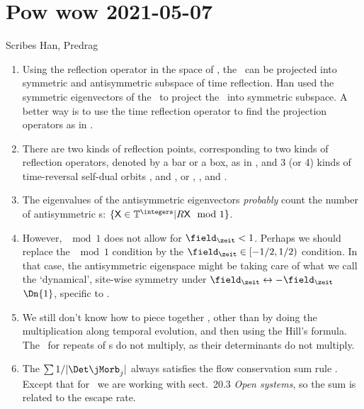 \section{Pow wow 2021-05-07}
\label{sect:pw2021-05-07}

Scribes Han, Predrag
\medskip

\begin{enumerate}
	\item
Using the reflection operator in the space of {\lattstate}, the
\jacobianOrb\ can be projected into symmetric and antisymmetric subspace
of time reflection. Han used the symmetric eigenvectors of the
\jacobianOrb\ to project the \jacobianOrb\ into symmetric subspace. A
better way is to use the time reflection operator to find the projection
operators as in .

	\item
There are two kinds of reflection points, corresponding to two kinds of
reflection operators, denoted by a bar or a box, as in
, and 3 (or 4) kinds of time-reversal self-dual
orbits
,
 and
, or
,
,
and
.

	\item
The eigenvalues of the antisymmetric eigenvectors \emph{probably} count
the number of antisymmetric {\lattstate}s:
$\{\Xx \in \mathbb{T}^\integers | R \Xx \mod 1\}$. %

	\item
However, $\mod 1$ does not allow for $\field_\zeit<1$. Perhaps we should
replace the  $\mod 1$ condition by the $\field_\zeit\in[-1/2,1/2)$
condition. In that case, the antisymmetric eigenspace might be taking
care of what we call the `dynamical', site-wise symmetry under
$\field_\zeit\leftrightarrow-\field_\zeit$ $\Dn{1}$, specific to
\templatt.

	\item
We still don't know how to piece together \jacobianOrbs, other than by
doing the multiplication along temporal evolution, and then using
the Hill's formula.
The \jacobianOrbs\ for repeats of {\orbit}s do not multiply, as their
determinants do not multiply.

	\item
The $\sum 1/|\Det\jMorb_{j}|$ always satisfies the flow conservation sum
rule . Except that for \Henon\ we
are working with  {sect.~20.3 {\em Open
systems}}, so the sum is related to the escape rate.
\end{enumerate}

